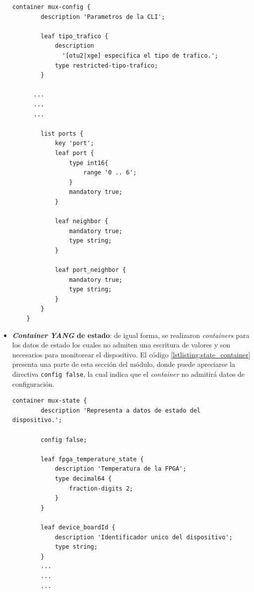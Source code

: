 \begin{itemize}
    \begin{lstlisting}[language=SHELXL, caption=\textit{Container} de configuración., label=lstlisting:config_container]
    container mux-config {
        description 'Parametros de la CLI';

        leaf tipo_trafico {
            description
              '[otu2|xge] especifica el tipo de trafico.';
            type restricted-tipo-trafico;
        }
      
      ...
      ...
      ...
        
        list ports {
            key 'port';
            leaf port {
                type int16{
                    range '0 .. 6';
                }
                mandatory true;
            }

            leaf neighbor {
                mandatory true;
                type string;
            }
            
            leaf port_neighbor {
                mandatory true;
                type string;
            }
        }
    }
    \end{lstlisting}

    \item \textbf{\textit{Container} \textit{YANG} de estado}: de igual forma, se realizaron \textit{containers} para los datos de estado los cuales no admiten una escritura de valores y son necesarios para monitorear el dispositivo. El código \ref{lstlisting:state_container} presenta una parte de esta sección del módulo, donde puede apreciarse la directiva \texttt{config false}, la cual indica que el \textit{container} no admitirá datos de configuración.  

    \begin{lstlisting}[language=SHELXL, caption=\textit{Container} de estado., label=lstlisting:state_container]
    container mux-state {
        description 'Representa a datos de estado del dispositivo.';
        
        config false;

        leaf fpga_temperature_state {
            description 'Temperatura de la FPGA';
            type decimal64 {
                fraction-digits 2;
            }
        }
   
        leaf device_boardId {
            description 'Identificador unico del dispositivo';
            type string;
        }
        ...
        ...
        ...
    \end{lstlisting}



\end{itemize}
